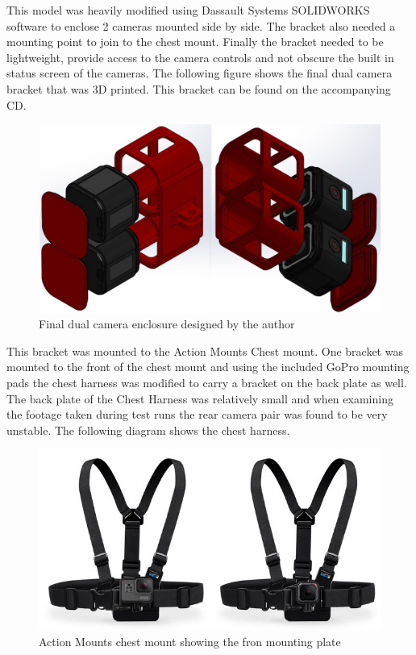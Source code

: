 This model was heavily modified using Dassault Systems SOLIDWORKS software to enclose 2 cameras mounted side by side. The bracket also needed a mounting point to join to the chest mount. Finally the bracket needed to be lightweight, provide access to the camera controls and not obscure the built in status screen of the cameras. The following figure shows the final dual camera bracket that was 3D printed. This bracket can be found on the accompanying CD.

\begin{figure}[!ht] 
\captionsetup{width=\linewidth, font=small}  
\includegraphics[width=\linewidth]{figures/stereoholder.JPG}
\caption{Final dual camera enclosure designed by the author}
\label{fig:stereoholder}
\end{figure}

This bracket was mounted to the Action Mounts Chest mount. One bracket was mounted to the front of the chest mount and using the included GoPro mounting pads the chest harness was modified to carry a bracket on the back plate as well. The back plate of the Chest Harness was relatively small and when examining the footage taken during test runs the rear camera pair was found to be very unstable. The following diagram shows the chest harness.

\begin{figure}[!ht] 
\captionsetup{width=\linewidth, font=small}  
\includegraphics[width=\linewidth]{figures/chesty.png}
\caption{Action Mounts chest mount showing the fron mounting plate}
\label{fig:chesty}
\end{figure}

